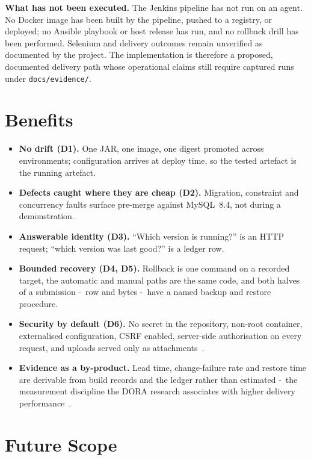 \documentclass[10pt,a4paper]{article}
\begin{document}
\textbf{What has not been executed.} The Jenkins pipeline has not run on an agent. No Docker image
has been built by the pipeline, pushed to a registry, or deployed; no Ansible playbook or host
release has run, and no rollback drill has been performed. Selenium and delivery outcomes remain
unverified as documented by the project. The implementation is therefore a proposed, documented
delivery path whose operational claims still require captured runs under
\texttt{docs/evidence/}.

\section{Benefits}

\begin{itemize}
  \item \textbf{No drift (D1).} One JAR, one image, one digest promoted across environments;
        configuration arrives at deploy time, so the tested artefact is the running artefact.
  \item \textbf{Defects caught where they are cheap (D2).} Migration, constraint and concurrency
        faults surface pre-merge against MySQL~8.4, not during a demonstration.
  \item \textbf{Answerable identity (D3).} ``Which version is running?'' is an HTTP request;
        ``which version was last good?'' is a ledger row.
  \item \textbf{Bounded recovery (D4, D5).} Rollback is one command on a recorded target, the
        automatic and manual paths are the same code, and both halves of a submission -\
        row and bytes -\ have a named backup and restore procedure.
  \item \textbf{Security by default (D6).} No secret in the repository, non-root container,
        externalised configuration, CSRF enabled, server-side authorisation on every request, and
        uploads served only as attachments~\cite{nist800190,owasp2021}.
  \item \textbf{Evidence as a by-product.} Lead time, change-failure rate and restore time are
        derivable from build records and the ledger rather than estimated -\ the
        measurement discipline the DORA research associates with higher delivery
        performance~\cite{forsgren2018,dora2024}.
\end{itemize}

\section{Future Scope}
\end{document}
